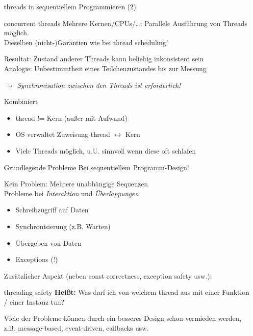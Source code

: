\begin{frame}{threads in sequentiellem Programmieren (2)}
	\begin{block}{concurrent threads}
		Mehrere Kernen/CPUs/\dots: Parallele Ausführung von Threads möglich.\\
		Dieselben (nicht-)Garantien wie bei thread scheduling!
	\end{block}
	
	Resultat: Zustand anderer Threads kann beliebig inkonsistent sein\\
	Analogie: Unbestimmtheit eines Teilchenzustandes bis zur Messung
	\begin{center}
		\emph{$\rightarrow$ Synchronisation zwischen den Threads ist erforderlich!}
	\end{center}
	
	\pause
	
	\begin{block}{Kombiniert}
		\begin{itemize}
			\item thread != Kern (außer mit Aufwand)
			\item OS verwaltet Zuweisung thread $\leftrightarrow$ Kern
			\item Viele Threads möglich, u.U. sinnvoll wenn diese oft schlafen
		\end{itemize}
	\end{block}
\end{frame}

\begin{frame}{Grundlegende Probleme}
	Bei sequentiellem Programm-Design!
	
	\vspace{0.5em}
	
	Kein Problem: Mehrere unabhängige Sequenzen\\
	Probleme bei \emph{Interaktion} und \emph{Überlappungen}
	\begin{itemize}
		\item Schreibzugriff auf Daten
		\item Synchronisierung (z.B. Warten)
		\item Übergeben von Daten
		\item Exceptions (!)
	\end{itemize}
	
	\vspace{0.5em}
	
	Zusätzlicher Aspekt (neben const correctness, exception safety usw.):
	\begin{block}{threading safety}
		\textbf{Heißt:} Was darf ich von welchem thread aus mit einer Funktion / einer Instanz tun?
	\end{block}
	
	\pause
	
	\alert{Viele der Probleme können durch ein besseres Design schon vermieden werden, z.B. message-based, event-driven, callbacks usw.}
\end{frame}


